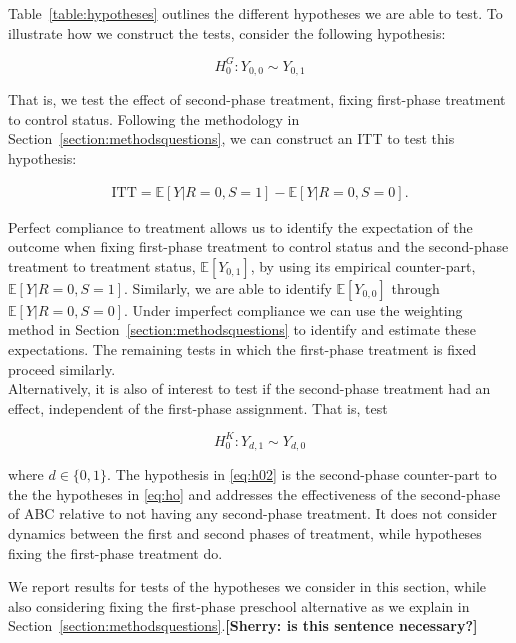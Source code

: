\noindent Table~\ref{table:hypotheses} outlines the different hypotheses we are able to test. To illustrate how we construct the tests, consider the following hypothesis: 

\begin{equation}
H_{0}^G: Y_{0,0} \sim Y_{0,1}  \label{eq:h0fixfirst}
\end{equation}

\noindent That is, we test the effect of second-phase treatment, fixing first-phase treatment to control status. Following the methodology in Section~\ref{section:methodsquestions}, we can construct an ITT to test this hypothesis: 

\begin{eqnarray}
\text{ITT} = \mathbb{E} \left[ Y | R = 0, S = 1 \right] - \mathbb{E} \left[ Y | R = 0, S = 0 \right]. 
\end{eqnarray}

\noindent Perfect compliance to treatment allows us to identify the expectation of the outcome when fixing first-phase treatment to control status and the second-phase treatment to treatment status, $\mathbb{E} \left[ Y_{0,1} \right]$, by using its empirical counter-part, $\mathbb{E} \left[ Y | R = 0, S = 1 \right]$. Similarly, we are able to identify $\mathbb{E} \left[ Y_{0,0} \right]$ through $\mathbb{E} \left[ Y | R = 0, S = 0 \right]$. Under imperfect compliance we can use the weighting method in Section~\ref{section:methodsquestions} to identify and estimate these expectations. The remaining tests in which the first-phase treatment is fixed proceed similarly.\\

\noindent Alternatively, it is also of interest to test if the second-phase treatment had an effect, independent of the first-phase assignment. That is, test 

\begin{equation}
H_{0}^K: Y_{d,1} \sim Y_{d,0} \label{eq:h02}
\end{equation}

\noindent where $d \in \{0,1\}$. The hypothesis in \eqref{eq:h02} is the second-phase counter-part to the the hypotheses in \eqref{eq:ho} and addresses the effectiveness of the second-phase of ABC relative to not having any second-phase treatment. It does not consider dynamics between the first and second phases of treatment, while hypotheses fixing the first-phase treatment do. 

\noindent We report results for tests of the hypotheses we consider in this section, while also considering fixing the first-phase preschool alternative as we explain in Section~\ref{section:methodsquestions}.\textbf{[Sherry: is this sentence necessary?]}


